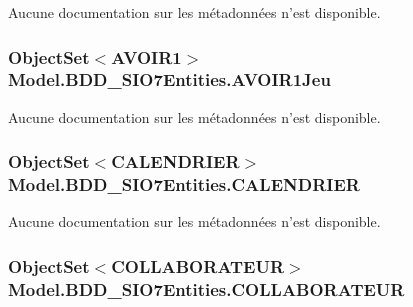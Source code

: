 Aucune documentation sur les métadonnées n'est disponible. 

\hypertarget{class_model_1_1_b_d_d___s_i_o7_entities_ab937f73f4b02147372c41c94fa4c6249}{
\subsubsection[{A\-V\-O\-I\-R1\-Jeu}]{\setlength{\rightskip}{0pt plus 5cm}Object\-Set$<${\bf A\-V\-O\-I\-R1}$>$ Model.\-B\-D\-D\-\_\-\-S\-I\-O7\-Entities.\-A\-V\-O\-I\-R1\-Jeu\hspace{0.3cm}{\ttfamily [get]}}}\label{class_model_1_1_b_d_d___s_i_o7_entities_ab937f73f4b02147372c41c94fa4c6249}


Aucune documentation sur les métadonnées n'est disponible. 

\hypertarget{class_model_1_1_b_d_d___s_i_o7_entities_af6cdc5ecd7668ffe0331bcf663733351}{
\subsubsection[{C\-A\-L\-E\-N\-D\-R\-I\-E\-R}]{\setlength{\rightskip}{0pt plus 5cm}Object\-Set$<${\bf C\-A\-L\-E\-N\-D\-R\-I\-E\-R}$>$ Model.\-B\-D\-D\-\_\-\-S\-I\-O7\-Entities.\-C\-A\-L\-E\-N\-D\-R\-I\-E\-R\hspace{0.3cm}{\ttfamily [get]}}}\label{class_model_1_1_b_d_d___s_i_o7_entities_af6cdc5ecd7668ffe0331bcf663733351}


Aucune documentation sur les métadonnées n'est disponible. 

\hypertarget{class_model_1_1_b_d_d___s_i_o7_entities_a40ce35269025503e79db707928e426cb}{
\subsubsection[{C\-O\-L\-L\-A\-B\-O\-R\-A\-T\-E\-U\-R}]{\setlength{\rightskip}{0pt plus 5cm}Object\-Set$<${\bf C\-O\-L\-L\-A\-B\-O\-R\-A\-T\-E\-U\-R}$>$ Model.\-B\-D\-D\-\_\-\-S\-I\-O7\-Entities.\-C\-O\-L\-L\-A\-B\-O\-R\-A\-T\-E\-U\-R\hspace{0.3cm}{\ttfamily [get]}}}\label{class_model_1_1_b_d_d___s_i_o7_entities_a40ce35269025503e79db707928e426cb}


